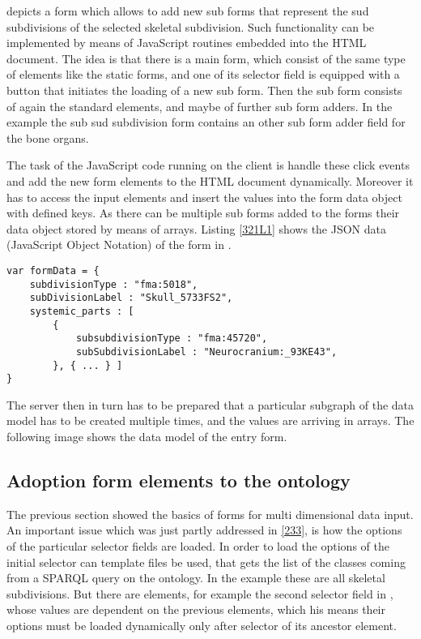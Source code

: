 

 depicts a form which allows to add new sub forms that represent the sud subdivisions of the selected skeletal subdivision. Such functionality can be implemented by means of JavaScript routines embedded into the HTML document. The idea is that there is a main form, which consist of the same type of elements like the static forms, and one of its selector field is equipped with a button that initiates the loading of a new sub form. Then the sub form consists of again the standard elements, and maybe of further sub form adders. In the example the sub
sud subdivision form contains an other sub form adder field for the bone organs.

The task of the JavaScript code running on the client is handle these click events and add the new form elements to the HTML document dynamically. Moreover it has to access the input elements and insert the values into the form data object with defined keys. As there can be multiple sub forms added to the forms their data object stored by means of arrays. Listing \ref{321L1} shows the JSON data (JavaScript Object Notation) of the form in . 

\begin{lstlisting}[captionpos=b, caption=JSON object generated by the form, label=321L1,
basicstyle=\footnotesize,frame=single]
var formData = {
	subdivisionType : "fma:5018",
	subDivisionLabel : "Skull_5733FS2",
	systemic_parts : [
		{
			subsubdivisionType : "fma:45720",
			subSubdivisionLabel : "Neurocranium:_93KE43",
		}, { ... } ]
}
\end{lstlisting}


The server then in turn has to be prepared that a particular subgraph of the data model has to be created multiple times, and the values are arriving in arrays. The following image shows the data model of the entry form.  





\subsection{Adoption form elements to the ontology} \label{322}


The previous section showed the basics of forms for multi dimensional data input. An important issue which was just partly addressed in \ref{233}, is how the options of the particular selector fields are loaded. In order to load the options of the initial selector can template files be used, that gets the list of the classes coming from a SPARQL query on the ontology. In the example these are all skeletal subdivisions. But there are elements, for example the second selector field in , whose values are dependent on the previous elements, which his means their options must be loaded dynamically only after selector of its ancestor element.

